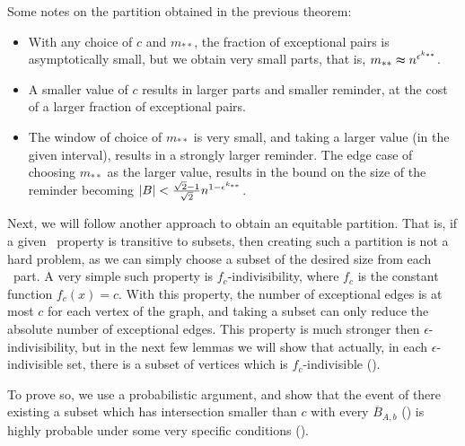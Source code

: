     \begin{remark}
        Some notes on the partition obtained in the previous theorem:
        \begin{itemize}
            \item With any choice of $c$ and $m_{**}$, the fraction of exceptional pairs is asymptotically small,
                but we obtain very small parts, that is, $m_{**} \thickapprox n^{\epsilon^{k_{**}}}$.
            \item A smaller value of $c$ results in larger parts and smaller reminder, at the cost of a larger fraction
                of exceptional pairs.
            \item The window of choice of $m_{**}$ is very small, and taking a larger value
                (in the given interval), results in a strongly larger reminder.
                The edge case of choosing $m_{**}$ as the larger value, results in the bound on the size of the
                reminder becoming $| B | < \frac{\sqrt{2}-1}{\sqrt{2}} n^{1-\epsilon^{k_{**}}}$.
        \end{itemize}
    \end{remark}

    Next, we will follow another approach to obtain an equitable partition.
    That is, if a given \regular~property is transitive to subsets, then creating such a partition is not a hard
    problem, as we can simply choose a subset of the desired size from each \regular~part.
    A very simple such property is $f_c$-indivisibility, where $f_c$ is the constant function $f_c(x) = c$.
    With this property, the number of exceptional edges is at most $c$ for each vertex of the graph,
    and taking a subset can only reduce the absolute number of exceptional edges.
    This property is much stronger then $\epsilon$-indivisibility, but in the next few lemmas we will show that actually,
    in each $\epsilon$-indivisible set, there is a subset of vertices which is $f_c$-indivisible
    ().

    To prove so, we use a probabilistic argument, and show that the event of there existing a subset which has
    intersection smaller than $c$ with every $\overline{B}_{A,b}$ () is highly
    probable under some very specific conditions ().


